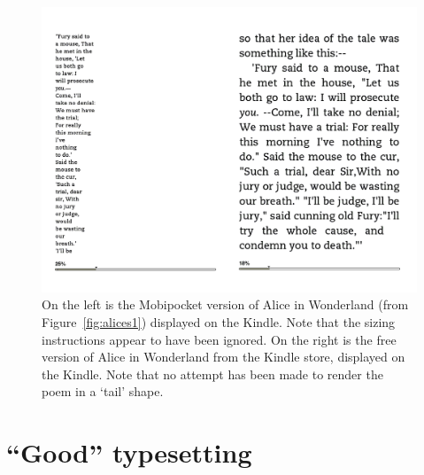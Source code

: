 \begin{figure}[tb]
\begin{center}
\vspace{-.3in}
\includegraphics[width=\textwidth]{gfx/alices2}
\end{center}
\vspace{-.3in}
\caption[The same document displayed on the Kindle]{On the left is the Mobipocket version of Alice in Wonderland (from Figure~\ref{fig:alices1}) displayed on the Kindle. Note that the sizing instructions appear to have been ignored. On the right is the free version of Alice in Wonderland from the Kindle store, displayed on the Kindle. Note that no attempt has been made to render the poem in a `tail' shape.}
\label{fig:alices2}
\end{figure}

\section{``Good'' typesetting}
\label{sec:goodtypesetting}


